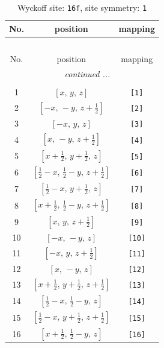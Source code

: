 \documentclass[fleqn,8pt]{jsarticle}
\begin{document}
\begin{longtable}{ccc}
\caption{Wyckoff site: {\tt 16f}, site symmetry: {\tt 1}}
 \\
 \hline \hline
No. & position & mapping \\ \hline \endfirsthead

\multicolumn{2}{l}{\tablename\ \thetable{}} \\
 \hline \hline
No. & position & mapping \\ \hline \endhead

 \hline \hline
\multicolumn{2}{r}{\footnotesize\it continued ...} \\ \endfoot

 \hline \hline
\multicolumn{2}{r}{} \\ \endlastfoot

1 & $\left[ x,\, y,\, z \right]$ & {\tt [1]} \\ \hline
2 & $\left[ - x,\, - y,\, z + \frac{1}{2} \right]$ & {\tt [2]} \\ \hline
3 & $\left[ - x,\, y,\, z \right]$ & {\tt [3]} \\ \hline
4 & $\left[ x,\, - y,\, z + \frac{1}{2} \right]$ & {\tt [4]} \\ \hline
5 & $\left[ x + \frac{1}{2},\, y + \frac{1}{2},\, z \right]$ & {\tt [5]} \\ \hline
6 & $\left[ \frac{1}{2} - x,\, \frac{1}{2} - y,\, z + \frac{1}{2} \right]$ & {\tt [6]} \\ \hline
7 & $\left[ \frac{1}{2} - x,\, y + \frac{1}{2},\, z \right]$ & {\tt [7]} \\ \hline
8 & $\left[ x + \frac{1}{2},\, \frac{1}{2} - y,\, z + \frac{1}{2} \right]$ & {\tt [8]} \\ \hline
9 & $\left[ x,\, y,\, z + \frac{1}{2} \right]$ & {\tt [9]} \\ \hline
10 & $\left[ - x,\, - y,\, z \right]$ & {\tt [10]} \\ \hline
11 & $\left[ - x,\, y,\, z + \frac{1}{2} \right]$ & {\tt [11]} \\ \hline
12 & $\left[ x,\, - y,\, z \right]$ & {\tt [12]} \\ \hline
13 & $\left[ x + \frac{1}{2},\, y + \frac{1}{2},\, z + \frac{1}{2} \right]$ & {\tt [13]} \\ \hline
14 & $\left[ \frac{1}{2} - x,\, \frac{1}{2} - y,\, z \right]$ & {\tt [14]} \\ \hline
15 & $\left[ \frac{1}{2} - x,\, y + \frac{1}{2},\, z + \frac{1}{2} \right]$ & {\tt [15]} \\ \hline
16 & $\left[ x + \frac{1}{2},\, \frac{1}{2} - y,\, z \right]$ & {\tt [16]} \\
\end{longtable}
\end{document}
